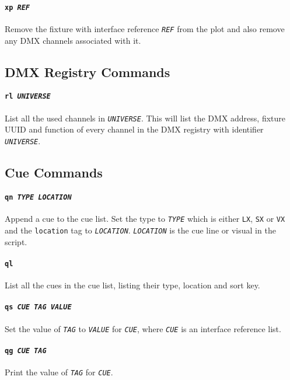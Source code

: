 \documentclass[a4paper]{article}
\begin{document}
\paragraph{\texttt{xp \textit{REF}}}
Remove the fixture with interface reference \texttt{\textit{REF}} from the 
plot and also remove any DMX channels associated with it.

\subsection{DMX Registry Commands}

\paragraph{\texttt{rl \textit{UNIVERSE}}}
List all the used channels in \texttt{\textit{UNIVERSE}}. This will list the 
DMX address, fixture UUID and function of every channel in the DMX registry 
with identifier \texttt{\textit{UNIVERSE}}.

\subsection{Cue Commands}

\paragraph{\texttt{qn \textit{TYPE LOCATION}}}
Append a cue to the cue list. Set the type to \texttt{\textit{TYPE}} which is 
either \texttt{LX}, \texttt{SX} or \texttt{VX} and the \texttt{location} tag 
to \texttt{\textit{LOCATION}}. \texttt{\textit{LOCATION}} is the cue line or 
visual in the script.

\paragraph{\texttt{ql}}
List all the cues in the cue list, listing their type, location and sort key.

\paragraph{\texttt{qs \textit{CUE TAG VALUE}}}
Set the value of \texttt{\textit{TAG}} to \texttt{\textit{VALUE}} for 
\texttt{\textit{CUE}}, where \texttt{\textit{CUE}} is an interface reference 
list.

\paragraph{\texttt{qg \textit{CUE TAG}}}
Print the value of \texttt{\textit{TAG}} for \texttt{\textit{CUE}}.
\end{document}
